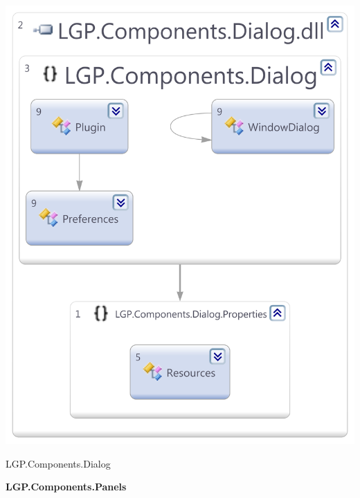 \begin{multicols}{2}
			\begin{figurehere}
				\centering
				\includegraphics[scale=0.30]{pages/appendix3/figures/dllscreens/dialog.png}
				\caption{LGP.Components.Dialog}
			\end{figurehere}
		
	\columnbreak
		
		\large{\bfseries{LGP.Components.Panels}}
		\vspace{5mm}
		

\end{multicols}
